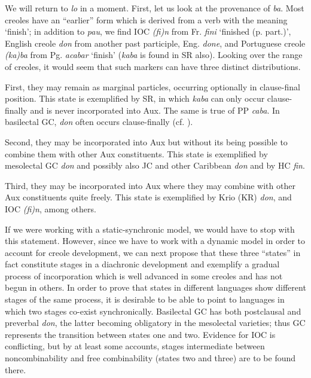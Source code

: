 We will return to \textit{lo} in a moment. First, let us look at the prove\-nance of \textit{ba}. Most creoles have an ``earlier'' form which is derived from a verb with the meaning `finish'; in addition to \textit{pau}, we find IOC \textit{(fi)n} from Fr. \textit{fini} `finished (p. part.)', English creole \textit{don} from another past participle, Eng. \textit{done}, and Portuguese creole \textit{(ka)ba} from Pg. \textit{acabar} `finish' (\textit{kaba} is found in SR also). Looking over the range of creoles, it would seem that such markers can have three distinct distributions.

First, they may remain as marginal particles, occurring option\-ally in clause-final position. This state is exemplified by SR, in which \textit{kaba} can only occur clause-finally and is never incorporated into Aux. The same is true of PP \textit{caba}. In basilectal GC, \textit{don} often occurs clause-finally (cf. \citealt[Examples 2.65--67]{Bickerton1975}).

Second, they may be incorporated into Aux but without its being possible to combine them with other Aux constituents. This state is exemplified by mesolectal GC \textit{don} and possibly also JC and other Caribbean \textit{don} and by HC \textit{fin}.

Third, they may be incorporated into Aux where they may combine with other Aux constituents quite freely. This state is exem\-plified by Krio (KR) \textit{don}, and IOC \textit{(fi)n}, among others.

If we were working with a static-synchronic model, we would have to stop with this statement. However, since we have to work with a dynamic model in order to account for creole development, we can next propose that these three ``states'' in fact constitute stages in a diachronic development and exemplify a gradual process of incorpora\-tion which is well advanced in some creoles and has not begun in others. In order to prove that states in different languages show differ\-ent stages of the same process, it is desirable to be able to point to languages in which two stages co-exist synchronically. Basilectal GC has both postclausal and preverbal \textit{don}, the latter becoming obligatory in the mesolectal varieties; thus GC represents the transition between states one and two. Evidence for IOC is conflicting, but by at least
some accounts, stages intermediate between noncombinability and free combinability (states two and three) are to be found there.

